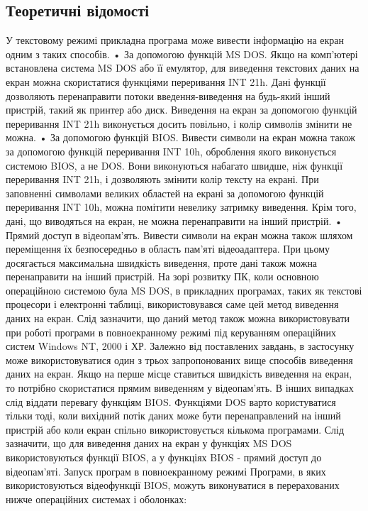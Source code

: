 \documentclass[12pt]{extarticle}
\begin{document}
\subsection*{Теоретичні відомості}
У текстовому режимі прикладна програма може вивести інформацію на
екран одним з таких способів.
• За допомогою функцій MS DOS. Якщо на комп'ютері встановлена
система MS DOS або її емулятор, для виведення текстових даних на екран можна
скористатися функціями переривання INT 21h. Дані функції дозволяють
перенаправити потоки введення-виведення на будь-який інший пристрій, такий
як принтер або диск. Виведення на екран за допомогою функцій переривання
INT 21h виконується досить повільно, і колір символів змінити не можна.
• За допомогою функцій BIOS. Вивести символи на екран можна також за
допомогою функцій переривання INT 10h, оброблення якого виконується
системою BIOS, а не DOS. Вони виконуються набагато швидше, ніж функції
переривання INT 21h, і дозволяють змінити колір тексту на екрані. При
заповненні символами великих областей на екрані за допомогою функцій
переривання INT 10h, можна помітити невелику затримку виведення. Крім того,
дані, що виводяться на екран, не можна перенаправити на інший пристрій.
• Прямий доступ в відеопам'ять. Вивести символи на екран можна також
шляхом переміщення їх безпосередньо в область пам'яті відеоадаптера. При
цьому досягається максимальна швидкість виведення, проте дані також можна
перенаправити на інший пристрій. На зорі розвитку ПК, коли основною
операційною системою була MS DOS, в прикладних програмах, таких як текстові
процесори і електронні таблиці, використовувався саме цей метод виведення
даних на екран. Слід зазначити, що даний метод також можна використовувати
при роботі програми в повноекранному режимі під керуванням операційних
систем Windows NT, 2000 і ХР.
Залежно від поставлених завдань, в застосунку може використовуватися
один з трьох запропонованих вище способів виведення даних на екран. Якщо на
перше місце ставиться швидкість виведення на екран, то потрібно скористатися
прямим виведенням у відеопам'ять. В інших випадках слід віддати перевагу
функціям BIOS. Функціями DOS варто користуватися тільки тоді, коли вихідний
потік даних може бути перенаправлений на інший пристрій або коли екран
спільно використовується кількома програмами. Слід зазначити, що для
виведення даних на екран у функціях MS DOS використовуються функції BIOS,
а у функціях BIOS - прямий доступ до відеопам'яті.
Запуск програм в повноекранному режимі
Програми, в яких використовуються відеофункції BIOS, можуть
виконуватися в перерахованих нижче операційних системах і оболонках:
\end{document}
